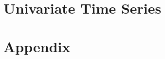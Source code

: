 \documentclass[a4paper]{report}
\begin{document}
\chapter{Univariate Time Series}

% 
% 
% 
% 
% 
% 

\chapter*{Appendix}

\nocite{*} %


\end{document}
